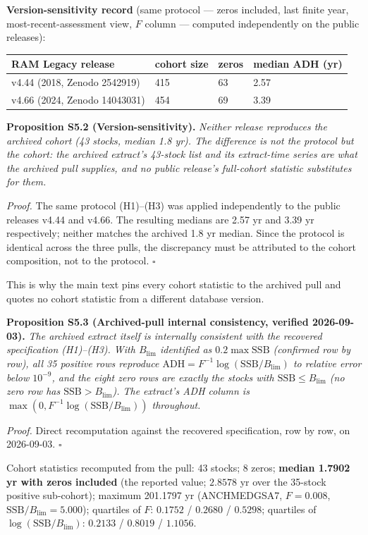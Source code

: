\documentclass[11pt]{article}
\begin{document}
\textbf{Version-sensitivity record} (same protocol --- zeros included, last finite year, most-recent-assessment view, \(F\) column --- computed independently on the public releases):

\begin{longtable}{@{}l|l|l|l@{}}
\toprule
RAM Legacy release & cohort size & zeros & median ADH (yr) \\
\midrule
v4.44 (2018, Zenodo 2542919) & 415 & 63 & 2.57 \\
v4.66 (2024, Zenodo 14043031) & 454 & 69 & 3.39 \\
\bottomrule
\end{longtable}

\textbf{Proposition S5.2 (Version-sensitivity).} \emph{Neither release reproduces the archived cohort (43 stocks, median 1.8 yr). The difference is not the protocol but the cohort: the archived extract's 43-stock list and its extract-time series are what the archived pull supplies, and no public release's full-cohort statistic substitutes for them.}

\emph{Proof.} The same protocol (H1)--(H3) was applied independently to the public releases v4.44 and v4.66. The resulting medians are 2.57 yr and 3.39 yr respectively; neither matches the archived 1.8 yr median. Since the protocol is identical across the three pulls, the discrepancy must be attributed to the cohort composition, not to the protocol. \(\square\)

This is why the main text pins every cohort statistic to the archived pull and quotes no cohort statistic from a different database version.

\textbf{Proposition S5.3 (Archived-pull internal consistency, verified 2026-09-03).} \emph{The archived extract itself is internally consistent with the recovered specification (H1)--(H3). With \(B_{\lim}\) identified as \(0.2\max\mathrm{SSB}\) (confirmed row by row), all 35 positive rows reproduce \(\mathrm{ADH} = F^{-1}\log(\mathrm{SSB}/B_{\lim})\) to relative error below \(10^{-9}\), and the eight zero rows are exactly the stocks with \(\mathrm{SSB} \le B_{\lim}\) (no zero row has \(\mathrm{SSB} > B_{\lim}\)). The extract's ADH column is \(\max(0, F^{-1}\log(\mathrm{SSB}/B_{\lim}))\) throughout.}

\emph{Proof.} Direct recomputation against the recovered specification, row by row, on 2026-09-03. \(\square\)

Cohort statistics recomputed from the pull: 43 stocks; 8 zeros; \textbf{median 1.7902 yr with zeros included} (the reported value; \(2.8578\) yr over the 35-stock positive sub-cohort); maximum 201.1797 yr (ANCHMEDGSA7, \(F=0.008\), \(\mathrm{SSB}/B_{\lim}=5.000\)); quartiles of \(F\): \(0.1752\) / \(0.2680\) / \(0.5298\); quartiles of \(\log(\mathrm{SSB}/B_{\lim})\): \(0.2133\) / \(0.8019\) / \(1.1056\).
\end{document}
